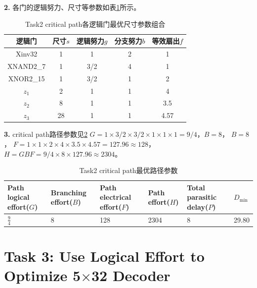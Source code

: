 \documentclass[UTF8,12pt,a4paper]{ctexart}
\begin{document}
\textbf{2.} 各门的逻辑努力、尺寸等参数如表\ref{tab:task2_best_gate_params}所示。

\begin{table}[htbp]
\centering
\caption{Task2 critical path各逻辑门最优尺寸参数组合}
\label{tab:task2_best_gate_params}
\begin{tabular}{ccccc}
\toprule
逻辑门 & 尺寸$s$ & 逻辑努力$g$ & 分支努力$b$ & 等效扇出$f$ \\
\midrule
Xinv32    & 1 & 1 & 2 & 1 \\
XNAND2\_7 & 1 & 3/2 & 4 & 1 \\
XNOR2\_15 & 1 & 3/2 & 1 & 2 \\
$z_1$     & 2 & 1 & 1 & 4 \\
$z_2$     & 8 & 1 & 1 & 3.5 \\
$z_3$     & 28 & 1 & 1 & 4.57 \\
\bottomrule
\end{tabular}
\end{table}

\textbf{3.} critical path路径参数见\ref{tab:task2_best_path_params}
$G = 1 \times 3/2 \times 3/2 \times 1 \times 1 \times 1 = 9/4 $，$B = 8 $，
$B = 8$，
$F = 1\times 1\times 2 \times 4 \times 3.5 \times 4.57 = 127.96 \approx 128$，
$H = GBF = 9/4 \times 8 \times 127.96 \approx 2304$。

\begin{table}[htbp]
    \centering
    \caption{Task2 critical path最优路径参数}
    \label{tab:task2_best_path_params}
    \begin{tabularx}{\linewidth}{XXXXXX}
    \toprule
    Path logical effort($G$) & Branching effort($B$) &
    Path electrical effort($F$) & Path effort($H$) &
    Total parasitic delay($P$) & $D_{\text{min}}$ \\
    \midrule
    $\frac{9}{4}$ & 8 & 128 & 2304 & 8 &  29.80 \\
    \bottomrule
    \end{tabularx}
\end{table}

\newpage
\section{Task 3: Use Logical Effort to Optimize 5$\times$32 Decoder}
\end{document}
